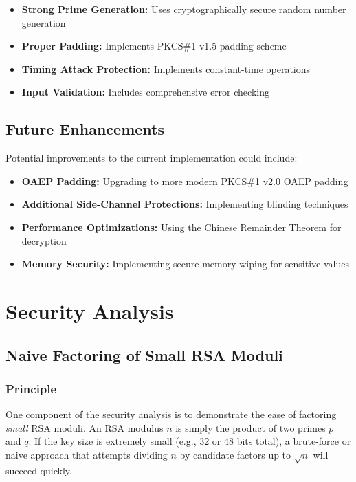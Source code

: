 \documentclass[12pt]{article}
\begin{document}
\begin{itemize}
    \item \textbf{Strong Prime Generation:} Uses cryptographically secure random number generation
    \item \textbf{Proper Padding:} Implements PKCS\#1 v1.5 padding scheme
    \item \textbf{Timing Attack Protection:} Implements constant-time operations
    \item \textbf{Input Validation:} Includes comprehensive error checking
\end{itemize}

\subsection{Future Enhancements}
Potential improvements to the current implementation could include:

\begin{itemize}
    \item \textbf{OAEP Padding:} Upgrading to more modern PKCS\#1 v2.0 OAEP padding
    \item \textbf{Additional Side-Channel Protections:} Implementing blinding techniques
    \item \textbf{Performance Optimizations:} Using the Chinese Remainder Theorem for decryption
    \item \textbf{Memory Security:} Implementing secure memory wiping for sensitive values
\end{itemize}

\section{Security Analysis}

\subsection{Naive Factoring of Small RSA Moduli}
\subsubsection{Principle}
One component of the security analysis is to demonstrate the ease of factoring \emph{small} RSA moduli. An RSA modulus \(n\) is simply the product of two primes \(p\) and \(q\). If the key size is extremely small (e.g., 32 or 48 bits total), a brute-force or naive approach that attempts dividing \(n\) by candidate factors up to \(\sqrt{n}\) will succeed quickly.
\end{document}

